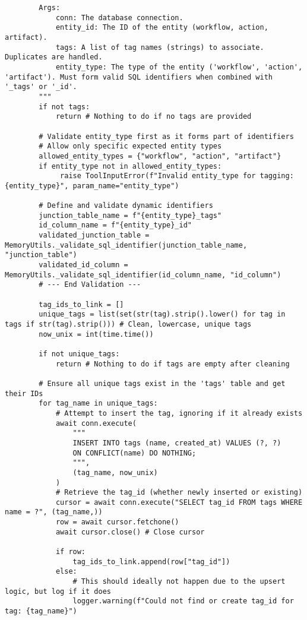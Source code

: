 \documentclass[12pt,a4paper]{article}
\begin{document}
\begin{pageablecode}
\begin{verbatim}
        Args:
            conn: The database connection.
            entity_id: The ID of the entity (workflow, action, artifact).
            tags: A list of tag names (strings) to associate. Duplicates are handled.
            entity_type: The type of the entity ('workflow', 'action', 'artifact'). Must form valid SQL identifiers when combined with '_tags' or '_id'.
        """
        if not tags:
            return # Nothing to do if no tags are provided

        # Validate entity_type first as it forms part of identifiers
        # Allow only specific expected entity types
        allowed_entity_types = {"workflow", "action", "artifact"}
        if entity_type not in allowed_entity_types:
             raise ToolInputError(f"Invalid entity_type for tagging: {entity_type}", param_name="entity_type")

        # Define and validate dynamic identifiers
        junction_table_name = f"{entity_type}_tags"
        id_column_name = f"{entity_type}_id"
        validated_junction_table = MemoryUtils._validate_sql_identifier(junction_table_name, "junction_table")
        validated_id_column = MemoryUtils._validate_sql_identifier(id_column_name, "id_column")
        # --- End Validation ---

        tag_ids_to_link = []
        unique_tags = list(set(str(tag).strip().lower() for tag in tags if str(tag).strip())) # Clean, lowercase, unique tags
        now_unix = int(time.time())

        if not unique_tags:
            return # Nothing to do if tags are empty after cleaning

        # Ensure all unique tags exist in the 'tags' table and get their IDs
        for tag_name in unique_tags:
            # Attempt to insert the tag, ignoring if it already exists
            await conn.execute(
                """
                INSERT INTO tags (name, created_at) VALUES (?, ?)
                ON CONFLICT(name) DO NOTHING;
                """,
                (tag_name, now_unix)
            )
            # Retrieve the tag_id (whether newly inserted or existing)
            cursor = await conn.execute("SELECT tag_id FROM tags WHERE name = ?", (tag_name,))
            row = await cursor.fetchone()
            await cursor.close() # Close cursor

            if row:
                tag_ids_to_link.append(row["tag_id"])
            else:
                # This should ideally not happen due to the upsert logic, but log if it does
                logger.warning(f"Could not find or create tag_id for tag: {tag_name}")


\end{verbatim}
\end{pageablecode}
\end{document}
